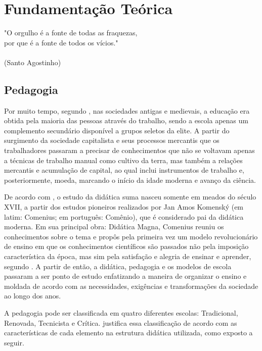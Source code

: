 \chapter{Fundamentação Teórica}
\label{chap:concep}

\begin{flushright}
	"O orgulho é a fonte de todas as fraquezas,\\ por que é a fonte de todos os vícios." \\
	\ \\
	(Santo Agostinho)
\end{flushright}
\section{Pedagogia}\label{sec:didatica}

Por muito tempo, segundo \cite{saviani}, nas sociedades antigas e medievais, a educação era obtida pela maioria das pessoas através do trabalho, sendo a escola apenas um complemento secundário disponível a grupos seletos da elite. A partir do surgimento da sociedade capitalista e seus processos mercantis que os trabalhadores passaram a precisar de conhecimentos que não se voltavam apenas a técnicas de trabalho manual como cultivo da terra, mas também a relações mercantis e acumulação de capital, ao qual inclui instrumentos de trabalho e, posteriormente, moeda, marcando o início da idade moderna e avanço da ciência.

De acordo com \cite{larchert}, o estudo da didática suma nasceu somente em meados do século XVII, a partir dos estudos pioneiros realizados por Jan Amos Komenský (em latim: Comenius; em português: Comênio), que é considerado pai da didática moderna. Em sua principal obra: Didática Magna, Comenius reuniu os conhecimentos sobre o tema e propôs pela primeira vez um modelo revolucionário de ensino em que os conhecimentos científicos são passados não pela imposição característica da época, mas sim pela satisfação e alegria de ensinar e aprender, segundo \cite{gasparin}. A partir de então, a didática, pedagogia e os modelos de escola passaram a ser ponto de estudo enfatizando a maneira de organizar o ensino e moldada de acordo com as necessidades, exigências e transformações da sociedade ao longo dos anos.

A pedagogia pode ser classificada em quatro diferentes escolas:  Tradicional, Renovada, Tecnicista e Crítica. \cite{larchert} justifica essa classificação de acordo com as características de cada elemento na estrutura didática utilizada, como exposto a seguir.

